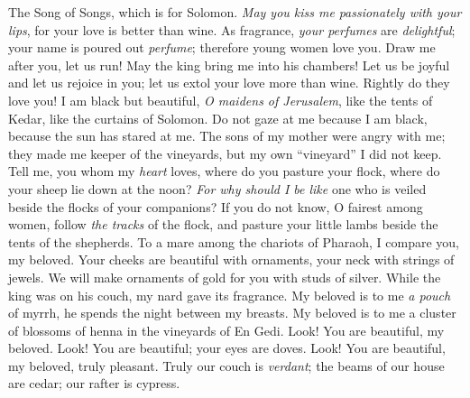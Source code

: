 
\begin{biblechapter} %
 The Song of Songs, which is for Solomon.
 \textit{May you kiss me} \textit{passionately with your lips}, 
for your love is better than wine.
\verse As fragrance, \textit{your perfumes} are \textit{delightful}; 
your name is poured out \textit{perfume}; 
therefore young women love you.
\verse Draw me after you, let us run! 
May the king bring me into his chambers! 
Let us be joyful and let us rejoice in you; 
let us extol your love more than wine. 
Rightly do they love you!
 I am black but beautiful, \textit{O maidens of Jerusalem}, 
like the tents of Kedar, like the curtains of Solomon.
\verse Do not gaze at me because I am black,  
because the sun has stared at me. 
The sons of my mother were angry with me; 
they made me keeper of the vineyards, 
but my own “vineyard” I did not keep.
 Tell me, you whom my \textit{heart} loves, 
where do you pasture your flock, 
where do your sheep lie down at the noon? 
\textit{For why should I be like} one who is veiled 
beside the flocks of your companions?
\verse If you do not know, O fairest among women, 
follow \textit{the tracks} of the flock, 
and pasture your little lambs beside the tents of the shepherds.
 To a mare among the chariots of Pharaoh, 
I compare you, my beloved.
\verse Your cheeks are beautiful with ornaments, 
your neck with strings of jewels.
\verse We will make ornaments of gold for you 
with studs of silver.
 While the king was on his couch, 
my nard gave its fragrance.
\verse My beloved is to me \textit{a pouch} of myrrh, 
he spends the night between my breasts.
\verse My beloved is to me a cluster of blossoms of henna 
in the vineyards of En Gedi.
 Look! You are beautiful, my beloved. 
Look! You are beautiful; 
your eyes are doves.
\verse Look! You are beautiful, my beloved, 
truly pleasant. 
Truly our couch is \textit{verdant};
\verse the beams of our house are cedar; 
our rafter is cypress.
\end{biblechapter}

